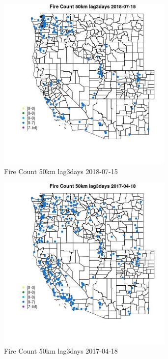 \begin{figure} 
\centering  
\includegraphics[width=0.77\textwidth]{Code_Outputs/Report_ML_input_PM25_Step4_part_e_de_duplicated_aves_compiled_2019-05-20wNAs_MapObsFire_Count_50km_lag3days2018-07-15.jpg} 
\caption{\label{fig:Report_ML_input_PM25_Step4_part_e_de_duplicated_aves_compiled_2019-05-20wNAsMapObsFire_Count_50km_lag3days2018-07-15}Fire Count 50km lag3days 2018-07-15} 
\end{figure} 
 

\clearpage 

\begin{figure} 
\centering  
\includegraphics[width=0.77\textwidth]{Code_Outputs/Report_ML_input_PM25_Step4_part_e_de_duplicated_aves_compiled_2019-05-20wNAs_MapObsFire_Count_50km_lag3days2017-04-18.jpg} 
\caption{\label{fig:Report_ML_input_PM25_Step4_part_e_de_duplicated_aves_compiled_2019-05-20wNAsMapObsFire_Count_50km_lag3days2017-04-18}Fire Count 50km lag3days 2017-04-18} 
\end{figure} 
 

